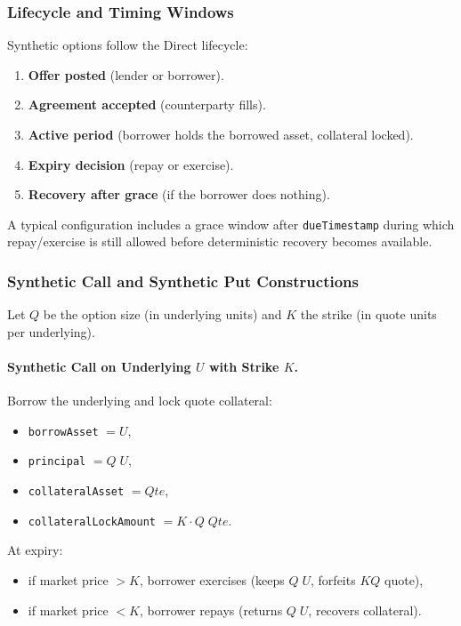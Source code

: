 \documentclass[version=preprint]{iacrcc}
\begin{document}
\subsubsection{Lifecycle and Timing Windows}

Synthetic options follow the Direct lifecycle:
\begin{enumerate}
  \item \textbf{Offer posted} (lender or borrower).
  \item \textbf{Agreement accepted} (counterparty fills).
  \item \textbf{Active period} (borrower holds the borrowed asset, collateral locked).
  \item \textbf{Expiry decision} (repay or exercise).
  \item \textbf{Recovery after grace} (if the borrower does nothing).
\end{enumerate}

A typical configuration includes a grace window after \texttt{dueTimestamp} during which repay/exercise is still allowed before deterministic recovery becomes available.

\subsubsection{Synthetic Call and Synthetic Put Constructions}

Let $Q$ be the option size (in underlying units) and $K$ the strike (in quote units per underlying).

\paragraph{Synthetic Call on Underlying $U$ with Strike $K$.}
Borrow the underlying and lock quote collateral:
\begin{itemize}
  \item \texttt{borrowAsset} $= U$,
  \item \texttt{principal} $= Q\;U$,
  \item \texttt{collateralAsset} $= Qte$,
  \item \texttt{collateralLockAmount} $= K \cdot Q\;Qte$.
\end{itemize}

At expiry:
\begin{itemize}
  \item if market price $> K$, borrower exercises (keeps $Q\;U$, forfeits $KQ$ quote),
  \item if market price $< K$, borrower repays (returns $Q\;U$, recovers collateral).
\end{itemize}
\end{document}
